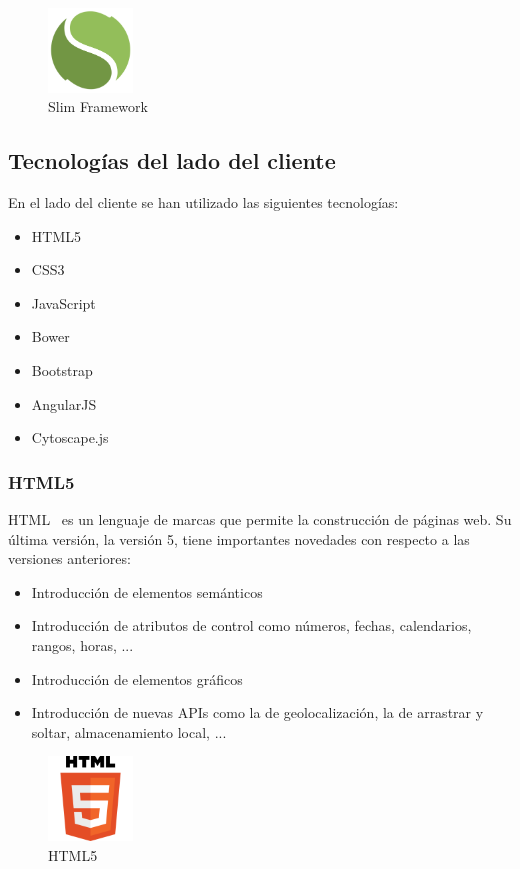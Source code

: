 \begin{figure}[tbh]
\centering
\label{fig:slim}
\includegraphics[width=0.2\textwidth]{imagenes/slim}
\caption{Slim Framework}
\end{figure}

\subsection{Tecnologías del lado del cliente}

En el lado del cliente se han utilizado las siguientes tecnologías:

\begin{itemize}
\item HTML5
\item CSS3
\item JavaScript
\item Bower
\item Bootstrap
\item AngularJS
\item Cytoscape.js
\end{itemize}

\subsubsection*{HTML5}

HTML~\cite{html5} es un lenguaje de marcas que permite la construcción de páginas web. Su última versión, la versión 5, tiene importantes novedades con respecto a las versiones anteriores:

\begin{itemize}
\item Introducción de elementos semánticos
\item Introducción de atributos de control como números, fechas, calendarios, rangos, horas, ...
\item Introducción de elementos gráficos
\item Introducción de nuevas APIs como la de geolocalización, la de arrastrar y soltar, almacenamiento local, ...
\end{itemize}   

\begin{figure}[tbh]
\centering
\label{fig:html5}
\includegraphics[width=0.2\textwidth]{imagenes/html5}
\caption{HTML5}
\end{figure}

